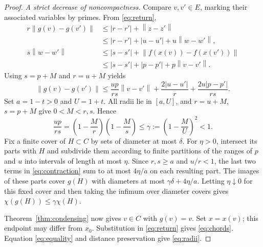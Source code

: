 \documentclass[11pt]{article}
\theoremstyle{remark}
\newcommand{\norm}[1]{\left\lVert#1\right\rVert}
\begin{document}
\begin{proof}
\smallskip\noindent\emph{A strict decrease of noncompactness.}
Compare $v,v'\in E$, marking their associated variables by primes. From \eqref{eq:return},
\begin{align*}
r\norm{g(v)-g(v')}
&\le |r-r'|+\norm{z-z'}\\
&\le |r-r'|+|u-u'|+u\norm{w-w'},\\
s\norm{w-w'}
&\le |s-s'|+\norm{f(x(v))-f(x(v'))}\\
&\le |s-s'|+|p-p'|+p\norm{v-v'}.
\end{align*}
Using $s=p+M$ and $r=u+M$ yields
\begin{equation}\label{eq:contraction}
\norm{g(v)-g(v')}
\le\frac{up}{rs}\norm{v-v'}
 +\frac{2|u-u'|}{r}+\frac{2u|p-p'|}{rs}.
\end{equation}
Set $a=1-t>0$ and $U=1+t$. All radii lie in $[a,U]$, and $r=u+M$, $s=p+M$ give $0<M<r,s$. Hence
\[
\frac{up}{rs}
=\left(1-\frac Mr\right)\left(1-\frac Ms\right)
\le\gamma:=\left(1-\frac{M}{U}\right)^2<1.
\]
Fix a finite cover of $H\subset C$ by sets of diameter at most $\delta$. For $\eta>0$, intersect its parts with $H$ and subdivide them according to finite partitions of the ranges of $p$ and $u$ into intervals of length at most $\eta$. Since $r,s\ge a$ and $u/r<1$, the last two terms in \eqref{eq:contraction} sum to at most $4\eta/a$ on each resulting part. The images of these parts cover $g(H)$ with diameters at most $\gamma\delta+4\eta/a$. Letting $\eta\downarrow0$ for this fixed cover and then taking the infimum over diameter covers gives $\chi(g(H))\le\gamma\chi(H)$.

Theorem~\ref{thm:condensing} now gives $v\in C$ with $g(v)=v$. Set $x=x(v)$; this endpoint may differ from $x_0$. Substitution in \eqref{eq:return} gives \eqref{eq:chords}. Equation \eqref{eq:equality} and distance preservation give \eqref{eq:radii}.
\end{proof}
\end{document}
